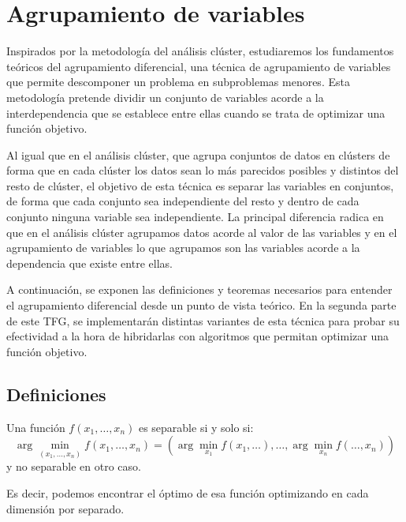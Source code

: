 
\chapter{Agrupamiento de variables}

Inspirados por la metodología del análisis clúster, estudiaremos los fundamentos teóricos del agrupamiento diferencial, una técnica de agrupamiento de variables que permite descomponer un problema en subproblemas menores. Esta metodología pretende dividir un conjunto de variables acorde a la interdependencia que se establece entre ellas cuando se trata de optimizar una función objetivo.

Al igual que en el análisis clúster, que agrupa conjuntos de datos en clústers de forma que en cada clúster los datos sean lo más parecidos posibles y distintos del resto de clúster, el objetivo de esta técnica es separar las variables en conjuntos, de forma que cada conjunto sea independiente del resto y dentro de cada conjunto ninguna variable sea independiente. La principal diferencia radica en que en el análisis clúster agrupamos datos acorde al valor de las variables y en el agrupamiento de variables lo que agrupamos son las variables acorde a la dependencia que existe entre ellas. 

A continuación, se exponen las definiciones y teoremas necesarios para entender el agrupamiento diferencial desde un punto de vista teórico. En la segunda parte de este TFG, se implementarán distintas variantes de esta técnica para probar su efectividad a la hora de hibridarlas con algoritmos que permitan optimizar una función objetivo.

\section{Definiciones}

\begin{definicion}
\label{1}
Una función \( f(x_1, \ldots, x_n) \) es separable si y solo si:
\[
\arg \min_{(x_1, \ldots, x_n)} f(x_1, \ldots, x_n) =
\left(
\arg \min_{x_1} f(x_1, \ldots), \ldots, \arg \min_{x_n} f(\ldots, x_n)
\right)
\]
y no separable en otro caso.
\end{definicion}

Es decir, podemos encontrar el óptimo de esa función optimizando en cada dimensión por separado.

